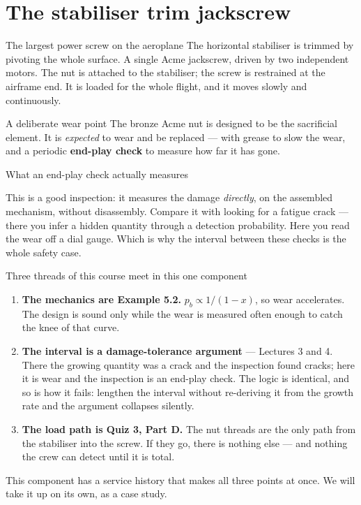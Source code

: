\documentclass[aspectratio=169,10pt]{beamer}
\begin{document}
\section{The stabiliser trim jackscrew}

\begin{frame}{The largest power screw on the aeroplane}
The horizontal stabiliser is trimmed by pivoting the whole surface.
\vfill
A single Acme jackscrew, driven by two independent motors. The nut is attached to the stabiliser; the
screw is restrained at the airframe end.
\vfill
It is loaded for the whole flight, and it moves slowly and continuously.
\vfill
\begin{alertblock}{A deliberate wear point}
The bronze Acme nut is designed to be the sacrificial element. It is \emph{expected} to wear and be
replaced --- with grease to slow the wear, and a periodic \textbf{end-play check} to measure how far it
has gone.
\end{alertblock}
\end{frame}

\begin{frame}{What an end-play check actually measures}
\centering
\resizebox{!}{3.5cm}{}
\vfill
\raggedright
{\small This is a good inspection: it measures the damage \emph{directly}, on the assembled mechanism,
without disassembly. Compare it with looking for a fatigue crack --- there you infer a hidden quantity
through a detection probability. Here you read the wear off a dial gauge.}
\vfill
\centering\alert{Which is why the interval between these checks is the whole safety case.}
\end{frame}


\begin{frame}{Three threads of this course meet in this one component}
\begin{enumerate}
  \item \textbf{The mechanics are Example 5.2.} $p_b \propto 1/(1-x)$, so wear accelerates. The design
        is sound only while the wear is measured often enough to catch the knee of that curve.
  \item \textbf{The interval is a damage-tolerance argument} --- Lectures 3 and 4. There the growing
        quantity was a crack and the inspection found cracks; here it is wear and the inspection is an
        end-play check. \alert{The logic is identical, and so is how it fails}: lengthen the interval
        without re-deriving it from the growth rate and the argument collapses silently.
  \item \textbf{The load path is Quiz 3, Part D.} The nut threads are the only path from the
        stabiliser into the screw. If they go, there is nothing else --- and nothing the crew can
        detect until it is total.
\end{enumerate}
\vfill
{\small This component has a service history that makes all three points at once. We will take it up
on its own, as a case study.}
\end{frame}
\end{document}
